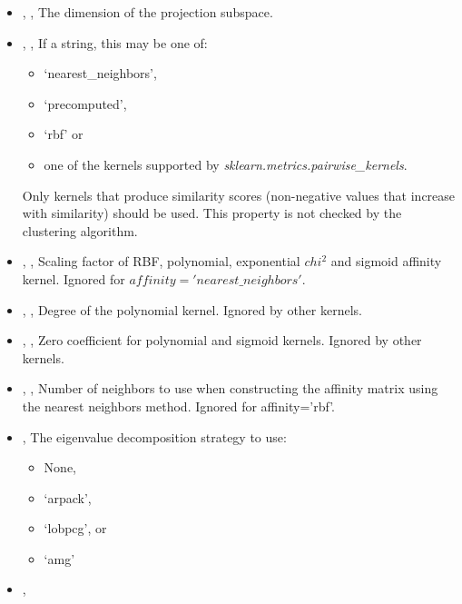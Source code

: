 \begin{itemize}
	\item {}, ,
	The dimension of the projection subspace.
	\item {}, , If a string, this may be one of:
	\begin{itemize}
		\item ‘nearest\_neighbors’,
		\item ‘precomputed’,
		\item ‘rbf’ or
		\item one of the kernels supported by \textit{sklearn.metrics.pairwise\_kernels}.
	\end{itemize}
	Only kernels that produce similarity scores (non-negative values that increase
	with similarity) should be used. This property is not checked by the clustering
	 algorithm. 
	\item {}, , Scaling factor of RBF,
	polynomial, exponential $chi^2$ and sigmoid affinity kernel.
	Ignored for $affinity='nearest\_neighbors'$. 
	\item {}, , Degree of the polynomial
	 kernel. Ignored by other kernels. 
	\item {}, , Zero coefficient for
	polynomial and sigmoid kernels. Ignored by other kernels. 
	\item {}, , Number of neighbors
	to use when constructing the affinity matrix using the nearest neighbors method.
	Ignored for affinity='rbf'. 
	\item {} ,  The eigenvalue
	decomposition strategy to use:
	\begin{itemize}
		\item None,
		\item ‘arpack’,
		\item ‘lobpcg’, or
		\item ‘amg’
	\end{itemize}	
	\item {}, 
\end{itemize}
